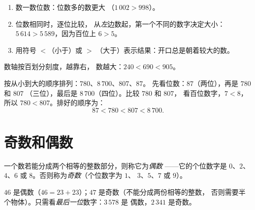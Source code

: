 \begin{method}[比较两个数]\label{met:g3:numbers:compare}
\begin{enumerate}
  \item 数一数位数：位数多的数更大
        （$1\,002 > 998$）。
  \item 位数相同时，逐位比较，
        从\emph{左}边数起，第一个不同的数字决定大小：
        $5\,614 > 5\,589$，因为百位上 $6 > 5$。
  \item 用符号 $<$（小于）或 $>$
        （大于）表示结果：开口总是朝着较大的数。
\end{enumerate}
\end{method}

\begin{omfigure}

{\small 数轴按百划分刻度，越靠右，
数越大：$240 < 690 < 905$。}
\end{omfigure}

\begin{example}\label{ex:g3:numbers:order}
按从小到大的顺序排列：$780$、$8\,700$、$807$、$87$。
先看位数：$87$（两位），再是 $780$ 和 $807$
（三位），最后是 $8\,700$（四位）。比较 $780$ 和 $807$，
看百位数字，$7 < 8$，所以 $780 < 807$。排好的顺序为：
\[
87 < 780 < 807 < 8\,700 .
\]
\end{example}

\section{奇数和偶数}

\begin{definition}[偶数、奇数]\label{def:g3:numbers:evenodd}
一个数若能分成两个相等的整数部分，则称它为\emph{偶数}
——它的个位数字是 $0$、$2$、$4$、$6$ 或
$8$。否则称为\emph{奇数}（个位数字为 $1$、
$3$、$5$、$7$ 或 $9$）。
\end{definition}

\begin{example}
$46$ 是偶数（$46 = 23 + 23$）；$47$ 是奇数（不能分成两份相等的整数，
否则需要半个物体）。只需看\emph{最后一位}数字：$3\,578$ 是
偶数，$2\,341$ 是奇数。
\end{example}

